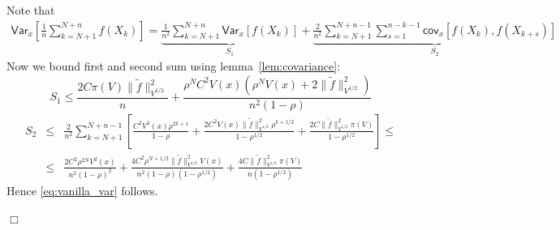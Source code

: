 \documentclass[bj]{imsart}
\def\PVar{\mathsf{Var}}
\def\PCov{\mathsf{cov}}
\newcommand{\proofendsign}{$\Box$}
\newenvironment{proof}{{\noindent \bf Proof }}
 {{\hspace*{\fill}\proofendsign\par\bigskip}}
\begin{document}
\begin{proof}
Note that
\begin{eqnarray*}
\PVar_x \left[ \frac{1}{n}\sum\limits_{k=N+1}^{N+n}f(X_k) \right] = \underbrace{\frac{1}{n^2}\sum\limits_{k=N+1}^{N+n}\PVar_x \left[ f(X_k) \right]}_{S_1} + \underbrace{\frac{2}{n^2}\sum\limits_{k=N+1}^{N+n-1}\sum\limits_{s=1}^{n-k-1}\PCov_x\left[f(X_k),f(X_{k+s})\right]}_{S_2}
\end{eqnarray*}
Now we bound first and second sum using lemma~\ref{lem:covariance}:
\[
S_1 \leq \frac{2C\pi(V)\|\tilde{f}\|^2_{V^{1/2}}}{n} + \frac{\rho^N C^2V(x)\left(\rho^NV(x) + 2\|\tilde{f}\|^2_{V^{1/2}}\right)}{n^2(1-\rho)}
\]
\begin{eqnarray*}
S_2 & \leq & \frac{2}{n^2}\sum\limits_{k=N+1}^{N+n-1}\left[\frac{C^2V^2(x)\rho^{2k+1}}{1-\rho} + \frac{2C^2V(x)\|\tilde{f}\|^2_{V^{1/2}}\rho^{k+1/2}}{1-\rho^{1/2}} + \frac{2C\|\tilde{f}\|^2_{V^{1/2}}\pi(V)}{1-\rho^{1/2}}\right] \leq \\
& \leq & \frac{2C^2\rho^{2N}V^2(x)}{n^2(1-\rho)^2} + \frac{4C^2\rho^{N+1/2}\|\tilde{f}\|^2_{V^{1/2}}V(x)}{n^2(1-\rho)(1-\rho^{1/2})} + \frac{4C\|\tilde{f}\|^2_{V^{1/2}}\pi(V)}{n(1-\rho^{1/2})}
\end{eqnarray*}
Hence \eqref{eq:vanilla_var} follows.
\end{proof}
\end{document}

